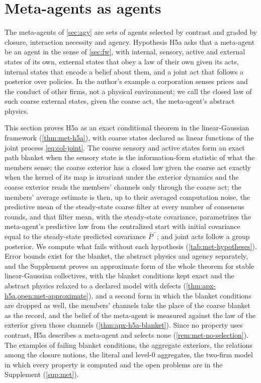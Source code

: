 \section{Meta-agents as agents}\label{sec:met}

The meta-agents of \cref{sec:agy} are sets of agents selected by contrast and graded by closure, interaction necessity and agency. Hypothesis H5a asks that a meta-agent be an agent in the sense of \cref{sec:fw}, with internal, sensory, active and external states of its own, external states that obey a law of their own given its acts, internal states that encode a belief about them, and a joint act that follows a posterior over policies. In the author's example a corporation senses prices and the conduct of other firms, not a physical environment; we call the closed law of such coarse external states, given the coarse act, the meta-agent's abstract physics.

This section proves H5a as an exact conditional theorem in the linear-Gaussian framework (\cref{thm:met-h5a}), with coarse states declared as linear functions of the joint process \eqref{eq:col-joint}. The coarse sensory and active states form an exact path blanket when the sensory state is the information-form statistic of what the members sense; the coarse exterior has a closed law given the coarse act exactly when the kernel of its map is invariant under the exterior dynamics and the coarse exterior reads the members' channels only through the coarse act; the members' average estimate is then, up to their averaged computation noise, the predictive mean of the steady-state coarse filter at every number of consensus rounds, and that filter mean, with the steady-state covariance, parametrizes the meta-agent's predictive law from the centralized start with initial covariance equal to the steady-state predicted covariance $\bar P^-$; and joint acts follow a group posterior. We compute what fails without each hypothesis (\cref{tab:met-hypotheses}). Error bounds exist for the blanket, the abstract physics and agency separately, and the Supplement proves an approximate form of the whole theorem for stable linear-Gaussian collectives, with the blanket conditions kept exact and the abstract physics relaxed to a declared model with defects (\cref{thm:apx-h5a,open:met-approximate}), and a second form in which the blanket conditions are dropped as well, the members' channels take the place of the coarse blanket as the record, and the belief of the meta-agent is measured against the law of the exterior given those channels (\cref{thm:apx-h5a-blanket}). Since no property uses contrast, H5a describes a meta-agent and selects none (\cref{rem:met-no-selection}). The examples of failing blanket conditions, the aggregate exteriors, the relations among the closure notions, the literal and level-0 aggregates, the two-firm model in which every property is computed and the open problems are in the Supplement (\cref{sup:met}).

